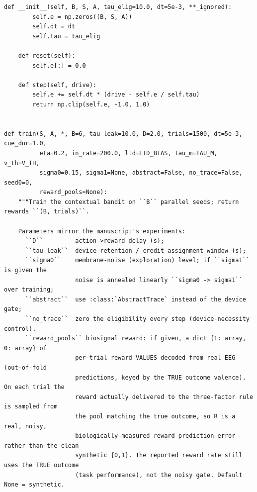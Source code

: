 \begin{lstlisting}[caption={mrl\_trace/bandit.py},label={lst:siox-src-bandit}]
    def __init__(self, B, S, A, tau_elig=10.0, dt=5e-3, **_ignored):
        self.e = np.zeros((B, S, A))
        self.dt = dt
        self.tau = tau_elig

    def reset(self):
        self.e[:] = 0.0

    def step(self, drive):
        self.e += self.dt * (drive - self.e / self.tau)
        return np.clip(self.e, -1.0, 1.0)


def train(S, A, *, B=6, tau_leak=10.0, D=2.0, trials=1500, dt=5e-3, cue_dur=1.0,
          eta=0.2, in_rate=200.0, ltd=LTD_BIAS, tau_m=TAU_M, v_th=V_TH,
          sigma0=0.15, sigma1=None, abstract=False, no_trace=False, seed0=0,
          reward_pools=None):
    """Train the contextual bandit on ``B`` parallel seeds; return rewards ``(B, trials)``.

    Parameters mirror the manuscript's experiments:
      ``D``         action->reward delay (s);
      ``tau_leak``  device retention / credit-assignment window (s);
      ``sigma0``    membrane-noise (exploration) level; if ``sigma1`` is given the
                    noise is annealed linearly ``sigma0 -> sigma1`` over training;
      ``abstract``  use :class:`AbstractTrace` instead of the device gate;
      ``no_trace``  zero the eligibility every step (device-necessity control).
      ``reward_pools`` biosignal reward: if given, a dict {1: array, 0: array} of
                    per-trial reward VALUES decoded from real EEG (out-of-fold
                    predictions, keyed by the TRUE outcome valence). On each trial the
                    reward actually delivered to the three-factor rule is sampled from
                    the pool matching the true outcome, so R is a real, noisy,
                    biologically-measured reward-prediction-error rather than the clean
                    synthetic {0,1}. The reported reward rate still uses the TRUE outcome
                    (task performance), not the noisy gate. Default None = synthetic.


\end{lstlisting}
